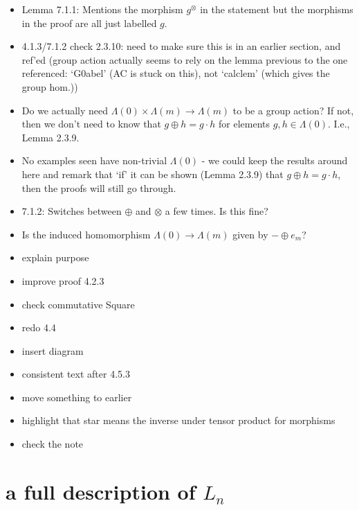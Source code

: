 \documentclass{amsart}
\begin{document}
\begin{itemize}
\item Lemma 7.1.1: Mentions the morphism $g^\otimes$ in the statement but the morphisms in the proof are all just labelled $g$.



\item 4.1.3/7.1.2 check 2.3.10: need to make sure this is in an earlier section, and ref'ed (group action actually seems to rely on the lemma previous to the one referenced: `G0abel' (AC is stuck on this), not `calclem' (which gives the group hom.))
\item Do we actually need $\Lambda(0) \times \Lambda(m) \rightarrow \Lambda(m)$ to be a group action? If not, then we don't need to know that $g \oplus h = g \cdot h$ for elements $g, h \in \Lambda(0)$. I.e., Lemma 2.3.9.
\item No examples seen have non-trivial $\Lambda(0)$ - we could keep the results around here and remark that `if' it can be shown (Lemma 2.3.9) that $g \oplus h = g \cdot h$, then the proofs will still go through.
\item 7.1.2: Switches between $\oplus$ and $\otimes$ a few times. Is this fine?
\item Is the induced homomorphism $\Lambda(0) \rightarrow \Lambda(m)$ given by $- \oplus e_m$?

\item explain purpose
\item improve proof 4.2.3

\item check commutative Square

\item redo 4.4
\item insert diagram

\item consistent text after 4.5.3
\item move something to earlier


\item highlight that star means the inverse under tensor product for morphisms




\item check the note


\end{itemize}



\section{a full description of $L_n $}
\end{document}
